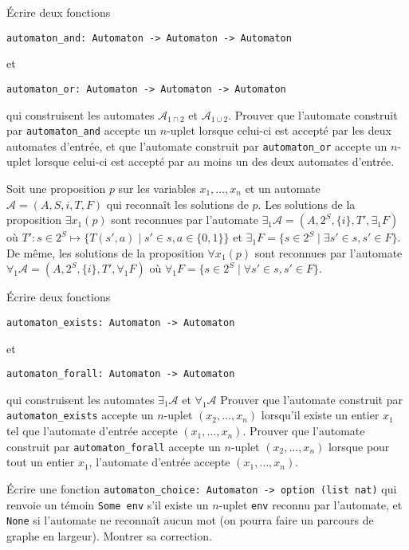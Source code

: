 \documentclass{article}
\begin{document}
Écrire deux fonctions
\begin{verbatim}
automaton_and: Automaton -> Automaton -> Automaton
\end{verbatim}
et
\begin{verbatim}
automaton_or: Automaton -> Automaton -> Automaton
\end{verbatim}
qui construisent les automates \(\mathcal A_{1 \cap 2}\) et \(\mathcal A_{1 \cup 2}\). Prouver que l'automate construit par \texttt{automaton_and} accepte un \(n\)-uplet lorsque celui-ci est accepté par les deux automates d'entrée, et que l'automate construit par \texttt{automaton_or}
accepte un \(n\)-uplet lorsque celui-ci est accepté par au moins un des deux automates d'entrée.

Soit une proposition \(p\) sur les variables \(x_1, \dots, x_n\) et un automate \(\mathcal A = (A, S, i, T, F)\) qui reconnaît les solutions de \(p\). Les solutions de la proposition \(\exists x_1 (p)\) sont reconnues par l'automate \(\exists_1 \mathcal A = (A, 2^S, \{i\}, T', \exists_1F)\) où \(T' : s \in 2^S \mapsto \{T(s', a) \mid s' \in s, a \in \{0, 1\}\}\)
et \(\exists_1F = \{s \in 2^S \mid \exists s' \in s, s' \in F\}\).
De même, les solutions de la proposition \(\forall x_1 (p)\)
sont reconnues par l'automate \(\forall_1 \mathcal A = (A, 2^S, \{i\}, T', \forall_1F)\)
où \(\forall_1F = \{s \in 2^S \mid \forall s' \in s, s' \in F\}\).

Écrire deux fonctions
\begin{verbatim}
automaton_exists: Automaton -> Automaton
\end{verbatim}
et
\begin{verbatim}
automaton_forall: Automaton -> Automaton
\end{verbatim}
qui construisent les automates \(\exists_1 \mathcal A\) et \(\forall_1 \mathcal A\)
Prouver que l'automate construit par \texttt{automaton_exists} accepte un \(n\)-uplet \((x_2, \dots, x_n)\)
lorsqu'il existe un entier \(x_1\) tel que l'automate d'entrée accepte \((x_1, \dots, x_n)\).
Prouver que l'automate construit par \texttt{automaton_forall} accepte un \(n\)-uplet \((x_2, \dots, x_n)\)
lorsque pour tout un entier \(x_1\), l'automate d'entrée accepte \((x_1, \dots, x_n)\).

Écrire une fonction \texttt{automaton_choice: Automaton -> option (list nat)} qui renvoie un témoin \texttt{Some env} s'il existe un \(n\)-uplet \texttt{env} reconnu par l'automate, et \texttt{None} si l'automate ne reconnaît aucun mot (on pourra faire un parcours de graphe en largeur). Montrer sa correction.
\end{document}
